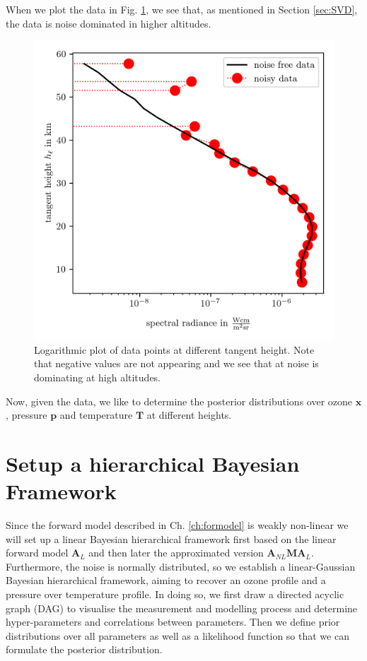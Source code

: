 When we plot the data in Fig. \ref{fig:DataPlot}, we see that, as mentioned in Section \ref{sec:SVD}, the data is noise dominated in higher altitudes.
\begin{figure}[ht!]
	\centering
	\includegraphics{DataPlot.png}
	\caption[Logarithmic plot of data points at different tangent height.]{Logarithmic plot of data points at different tangent height. Note that negative values are not appearing and we see that at noise is dominating at high altitudes.}
	\label{fig:DataPlot}
\end{figure}
Now, given the data, we like to determine the posterior distributions over ozone $\bm{x}$, pressure $\bm{p}$ and temperature $\bm{T}$ at different heights.



\section{Setup a hierarchical Bayesian Framework}
\label{sec:BayModel}
Since the forward model described in Ch. \ref{ch:formodel} is weakly non-linear we will set up a linear Bayesian hierarchical framework first based on the linear forward model $\bm{A}_L$ and then later the approximated version $\bm{A}_{NL}\bm{M} \bm{A}_L$.
Furthermore, the noise is normally distributed, so we establish a linear-Gaussian Bayesian hierarchical framework, aiming to recover an ozone profile and a pressure over temperature profile.
In doing so, we first draw a directed acyclic graph (DAG) to visualise the measurement and modelling process and determine hyper-parameters and correlations between parameters.
Then we define prior distributions over all parameters as well as a likelihood function so that we can formulate the posterior distribution.


